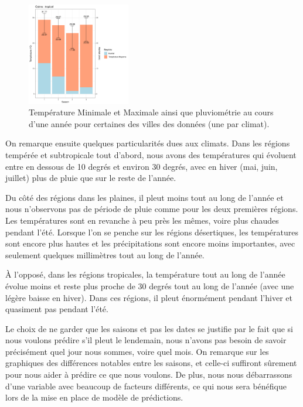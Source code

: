 \documentclass{article}
\begin{document}
\begin{figure}[p]
        \includegraphics[page=1,width=0.4\textwidth]{Images/temp_and_rainfall/Temp_and_Rainfalltropical.pdf}
    \caption{Température Minimale et Maximale ainsi que pluviométrie au cours d'une année pour certaines des villes des données (une par climat).}
    \label{fig:temp_and_rainfall}
\end{figure}

On remarque ensuite quelques particularités dues aux climats. Dans les régions tempérée et subtropicale tout d'abord, nous avons des températures qui évoluent entre en dessous de 10 degrés et environ 30 degrés, avec en hiver (mai, juin, juillet) plus de pluie que sur le reste de l'année.

Du côté des régions dans les plaines, il pleut moins tout au long de l'année et nous n'observons pas de période de pluie comme pour les deux premières régions. Les températures sont en revanche à peu près les mêmes, voire plus chaudes pendant l'été. Lorsque l'on se penche sur les régions désertiques, les températures sont encore plus hautes et les précipitations sont encore moins importantes, avec seulement quelques millimètres tout au long de l'année. 

À l'opposé, dans les régions tropicales, la température tout au long de l'année évolue moins et reste plus proche de 30 degrés tout au long de l'année (avec une légère baisse en hiver). Dans ces régions, il pleut énormément pendant l'hiver et quasiment pas pendant l'été.

Le choix de ne garder que les saisons et pas les dates se justifie par le fait que si nous voulons prédire s'il pleut le lendemain, nous n'avons pas besoin de savoir précisément quel jour nous sommes, voire quel mois. On remarque sur les graphiques des différences notables entre les saisons, et celle-ci suffiront sûrement pour nous aider à prédire ce que nous voulons. De plus, nous nous débarrassons d'une variable avec beaucoup de facteurs différents, ce qui nous sera bénéfique lors de la mise en place de modèle de prédictions.
\end{document}
